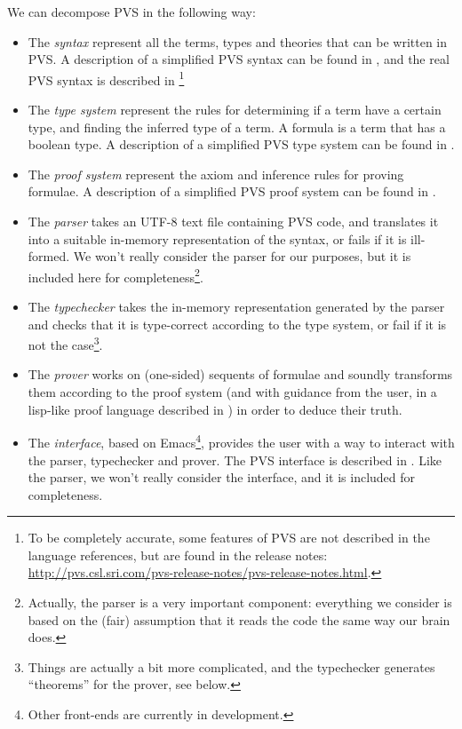 \documentclass[utf8,a4paper]{article}
\begin{document}
We can decompose PVS in the following way:
\begin{itemize}
\item The \textit{syntax} represent all the terms, types and theories
  that can be written in PVS. A description of a simplified PVS syntax
  can be found in \cite{PVS-Semantics:TR}, and the real PVS syntax is
  described in \cite{PVS:language}\footnote{To be completely accurate,
    some features of PVS are not described in the language references,
    but are found in the release notes:
    \url{http://pvs.csl.sri.com/pvs-release-notes/pvs-release-notes.html}.}
\item The \textit{type system} represent the rules for determining if
  a term have a certain type, and finding the inferred type of a
  term. A formula is a term that has a boolean type. A description of
  a simplified PVS type system can be found in \cite{PVS-Semantics:TR}.
\item The \textit{proof system} represent the axiom and inference
  rules for proving formulae. A description of a simplified PVS proof
  system can be found in \cite{PVS-Semantics:TR}.
\item The \textit{parser} takes an UTF-8 text file containing PVS
  code, and translates it into a suitable in-memory representation of
  the syntax, or fails if it is ill-formed. We won't really consider
  the parser for our purposes, but it is included here for
  completeness\footnote{Actually, the parser is a very important
    component: everything we consider is based on the (fair)
    assumption that it reads the code the same way our brain does.}.
\item The \textit{typechecker} takes the in-memory representation
  generated by the parser and checks that it is type-correct according
  to the type system, or fail if it is not the case\footnote{Things
    are actually a bit more complicated, and the typechecker generates
    ``theorems'' for the prover, see below.}.
\item The \textit{prover} works on (one-sided) sequents of formulae
  and soundly transforms them according to the proof system (and with
  guidance from the user, in a lisp-like proof language described in
  \cite{PVS:prover}) in order to deduce their truth. 
\item The \textit{interface}, based on Emacs\footnote{Other front-ends
    are currently in development.}, provides the user with a way to
  interact with the parser, typechecker and prover. The PVS interface
  is described in \cite{PVS:userguide}. Like the parser, we won't
  really consider the interface, and it is included for completeness.
\end{itemize}
\end{document}
